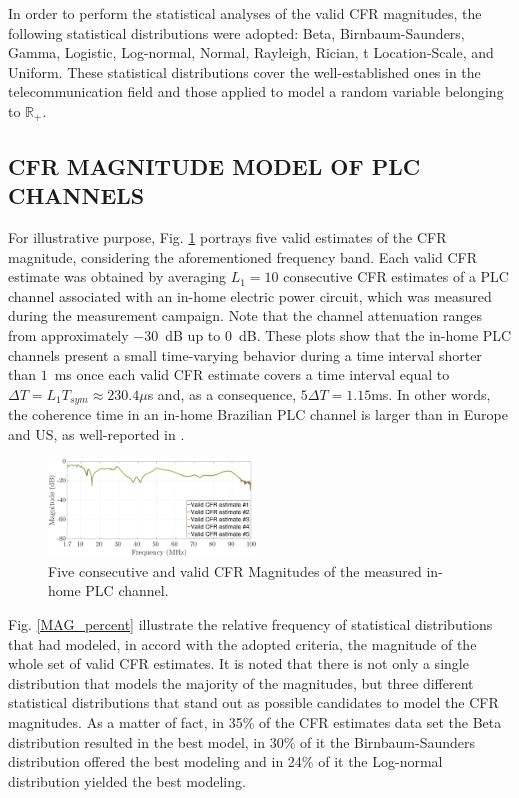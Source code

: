 \documentclass[journal]{IEEEtran}
\begin{document}
In order to perform the statistical analyses of the valid \ac{CFR} magnitudes, the following statistical distributions were adopted: Beta, Birnbaum-Saunders, Gamma, Logistic, Log-normal, Normal, Rayleigh, Rician, t Location-Scale, and Uniform. These statistical distributions cover the well-established ones in the telecommunication field and those applied to model a random variable belonging to $\mathbb{R}_+$.

\subsection{CFR MAGNITUDE MODEL OF PLC CHANNELS}\label{sec:MMPLC}

For illustrative purpose, Fig. \ref{respfreq} portrays five valid estimates of the \ac{CFR} magnitude, considering the aforementioned frequency band. Each valid \ac{CFR} estimate was obtained by averaging  $L_1 = 10$ consecutive \ac{CFR} estimates of a \ac{PLC} channel associated with an in-home electric power circuit, which was measured during the measurement campaign. Note that the channel attenuation ranges from approximately $-30$~dB up to $0$~dB. These plots show that the in-home \ac{PLC} channels present a small time-varying behavior during a time interval shorter than $1$~ms once each valid \ac{CFR} estimate covers a time interval equal to $\Delta T = L_1 T_{sym} \approx 230.4\mu$s and, as a consequence, $5\Delta T = 1.15$ms. In other words, the coherence time in an in-home Brazilian PLC channel is larger than in Europe and US, as well-reported in \cite{Thiago:Characterization}.

\begin{figure}[h]
	\centering
	\includegraphics[width=0.49\textwidth]{images/respfreq_1.7.eps}
	\caption{Five consecutive and valid \ac{CFR} Magnitudes of the measured in-home \ac{PLC} channel.}
	\label{respfreq}
\end{figure}

Fig. \ref{MAG_percent} illustrate the relative frequency of statistical distributions that had modeled, in accord with the adopted criteria, the magnitude of the whole set of valid \ac{CFR} estimates. It is noted that there is not only a single distribution that models the majority of the magnitudes, but three different statistical distributions that stand out as possible candidates to model the \ac{CFR} magnitudes. As a matter of fact, in 35\% of the \ac{CFR} estimates data set the Beta distribution resulted in the best model, in 30\% of it  the Birnbaum-Saunders distribution offered the best modeling and in 24\% of it the Log-normal distribution yielded the best modeling. 
\end{document}

